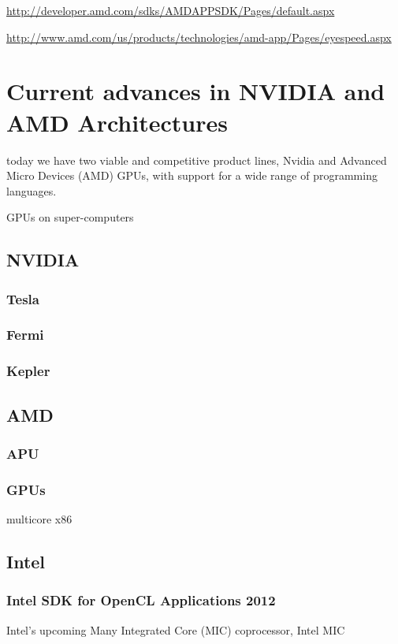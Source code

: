 \hyperref[AMD 1]{http://developer.amd.com/sdks/AMDAPPSDK/Pages/default.aspx}

\hyperref[AMD 2]{http://www.amd.com/us/products/technologies/amd-app/Pages/eyespeed.aspx}










\section{Current advances in NVIDIA and AMD Architectures}
today we have two viable and
competitive product lines, Nvidia and Advanced
Micro Devices (AMD) GPUs, with support for a
wide range of programming languages.

GPUs on super-computers

\subsection{NVIDIA}
\subsubsection{Tesla}
\subsubsection{Fermi}
\subsubsection{Kepler}

\subsection{AMD}
\subsubsection{APU}
\subsubsection{GPUs}
multicore x86

\subsection{Intel}
\subsubsection{Intel SDK for OpenCL Applications 2012}

Intel's upcoming Many Integrated Core (MIC) coprocessor, Intel MIC
